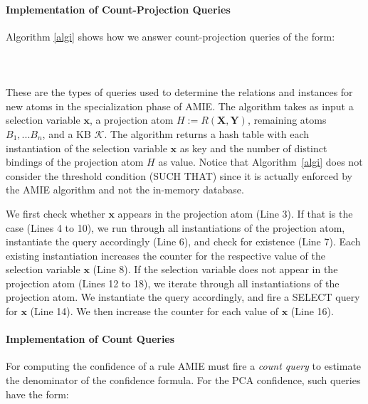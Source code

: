 \paragraph{Implementation of Count-Projection Queries} Algorithm \ref{algi} shows how we answer count-projection queries
of the form: \\ \\
 \\ \\
These are the types of queries used to determine the relations and instances for new atoms in the specialization
phase of AMIE. The algorithm takes as input a selection variable $\bm{x}$, a projection atom $H:=R(\bm{X},\bm{Y})$, remaining atoms $B_1, ... B_n$, 
and a KB $\mathcal{K}$. 
The algorithm returns a hash table with each instantiation of the selection variable 
$\bm{x}$ as key and the number of distinct bindings of the projection atom $H$ as value. Notice that Algorithm~\ref{algi}
does not consider the threshold condition (SUCH THAT) since it is actually enforced by the AMIE algorithm and not 
the in-memory database. 

We first check whether $\bm{x}$ appears in the projection atom (Line 3).
If that is the case (Lines 4 to 10), we run through all instantiations of the projection atom, instantiate the query accordingly (Line 6), and check for existence (Line 7).
Each existing instantiation increases the counter for the respective value of the selection variable $\bm{x}$ (Line 8). 
If the selection variable does not appear in the projection atom (Lines 12 to 18), 
we iterate through all instantiations of the projection atom.
We instantiate the query accordingly, and fire a SELECT query for $\bm{x}$ (Line 14). 
We then increase the counter for each value of $\bm{x}$ (Line 16).


\paragraph{Implementation of Count Queries} 
For computing the confidence of a rule AMIE must fire a \emph{count query} to estimate the denominator
of the confidence formula. For the PCA confidence, such queries have the form: \\

 \\

